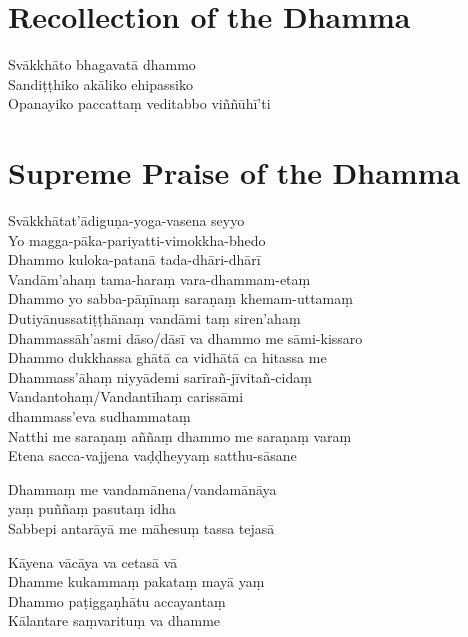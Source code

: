 \section*{Recollection of the Dhamma}

\begin{leader}
\end{leader}

Svākkhāto bhagavatā dhammo\\
Sandiṭṭhiko akāliko ehipassiko\\
Opanayiko paccattaṃ veditabbo viññūhī'ti

\section*{Supreme Praise of the Dhamma}

\begin{leader}
\end{leader}

Svākkhātat'ādiguṇa-yoga-vasena seyyo\\
Yo magga-pāka-pariyatti-vimokkha-bhedo\\
Dhammo kuloka-patanā tada-dhāri-dhārī\\
Vandām'ahaṃ tama-haraṃ vara-dhammam-etaṃ\\
Dhammo yo sabba-pāṇīnaṃ saraṇaṃ khemam-uttamaṃ\\
Dutiyānussatiṭṭhānaṃ vandāmi taṃ siren'ahaṃ\\
Dhammassāh'asmi dāso/dāsī va dhammo me sāmi-kissaro\\
Dhammo dukkhassa ghātā ca vidhātā ca hitassa me\\
Dhammass'āhaṃ niyyādemi sarīrañ-jīvitañ-cidaṃ\\
Vandantohaṃ/Vandantīhaṃ carissāmi\\
\vin dhammass'eva sudhammataṃ\\
Natthi me saraṇaṃ aññaṃ dhammo me saraṇaṃ varaṃ\\
Etena sacca-vajjena vaḍḍheyyaṃ satthu-sāsane

\clearpage

Dhammaṃ me vandamānena/vandamānāya\\
\vin yaṃ puññaṃ pasutaṃ idha\\
Sabbepi antarāyā me māhesuṃ tassa tejasā


Kāyena vācāya va cetasā vā\\
Dhamme kukammaṃ pakataṃ mayā yaṃ\\
Dhammo paṭiggaṇhātu accayantaṃ\\
Kālantare saṃvarituṃ va dhamme

